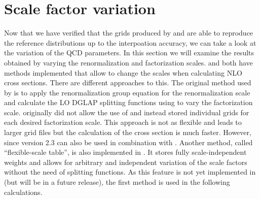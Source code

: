 \section{Scale factor variation}
Now that we have verified that the grids produced by \appl{} and \fnlo{} are able to reproduce the reference distributions up to the interpoation accuracy, we can take a look at the variation of the QCD parameters.
In this section we will examine the results obtained by varying the renormalization and factorization scales.
\appl{} and \fnlo{} both have methods implemented that allow to change the scales when calculating NLO cross sections.
There are different approaches to this.
The original method used by \appl{} is to apply the renormalization group equation for the renormalization scale and calculate the LO DGLAP splitting functions using \hoppet{} \cite{hoppet} to vary the factorization scale.
\fnlo{} originally did not allow the use of \hoppet{} and instead stored individual grids for each desired factorization scale.
This approach is not as flexible and leads to larger grid files but the calculation of the cross section is much faster.
However, since version 2.3 \fnlo{} can also be used in combination with \hoppet{}.
Another method, called \enquote{flexible-scale table}, is also implemented in \fnlo{}.
It stores fully scale-independent weights and allows for arbitrary and independent variation of the scale factors without the need of splitting functions.
As this feature is not yet implemented in \mcgrid{} (but will be in a future release), the first method is used in the following calculations.


